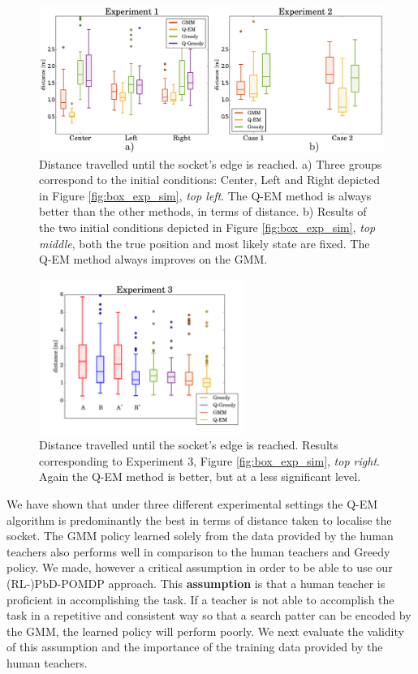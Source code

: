 \begin{figure}
 \centering
  \includegraphics[width=\textwidth]{./ch4-PiH/Figures/Fig/experiment_1_2.pdf}
  \caption{Distance travelled until the socket's edge is reached. a) Three groups correspond to the initial conditions: Center, Left and Right
   depicted in Figure \ref{fig:box_exp_sim}, \textit{top left}. The Q-EM method is always better than the other methods, in terms of distance. b)
   Results of the two initial conditions depicted in Figure \ref{fig:box_exp_sim}, \textit{top middle}, both the true position and most likely state are
   fixed. The Q-EM method always improves on the GMM. }
   \label{fig:three_searches}
\end{figure}
\begin{figure}
 \centering
  \includegraphics[width=0.6\textwidth]{./ch4-PiH/Figures/Fig/experiment3_plot2.pdf}
  \caption{Distance travelled until the socket's edge is reached. Results corresponding to Experiment 3, Figure \ref{fig:box_exp_sim}, \textit{top right}.
   Again the Q-EM method is better, but at a less significant level.}
   \label{fig:three_searches_exp3}
\end{figure}
 

We have shown that under three different experimental settings the Q-EM algorithm is predominantly the best in terms of distance taken 
to localise the socket. The GMM policy learned solely from the data provided by the human teachers also performs well in comparison to  
the human teachers and Greedy policy. We made, however a critical assumption in order to be able to use our (RL-)PbD-POMDP approach. 
This \textbf{assumption} is that a human teacher is proficient in accomplishing the task. If a teacher is not able to accomplish 
the task in a repetitive and consistent way so that a search patter can be encoded by the GMM, the learned policy will perform poorly.
We next evaluate the validity of this assumption and the importance of the training data provided by the human teachers.
% 
